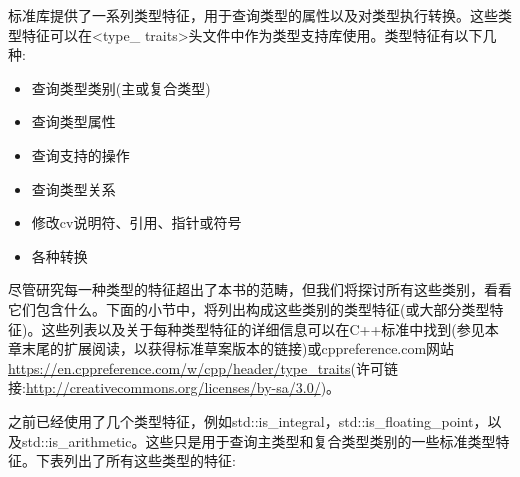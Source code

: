 
标准库提供了一系列类型特征，用于查询类型的属性以及对类型执行转换。这些类型特征可以在<type\_ traits>头文件中作为类型支持库使用。类型特征有以下几种:

\begin{itemize}
\item
查询类型类别(主或复合类型)

\item
查询类型属性

\item
查询支持的操作

\item
查询类型关系

\item
修改cv说明符、引用、指针或符号

\item
各种转换
\end{itemize}

尽管研究每一种类型的特征超出了本书的范畴，但我们将探讨所有这些类别，看看它们包含什么。下面的小节中，将列出构成这些类别的类型特征(或大部分类型特征)。这些列表以及关于每种类型特征的详细信息可以在C++标准中找到(参见本章末尾的扩展阅读，以获得标准草案版本的链接)或cppreference.com网站\url{https://en.cppreference.com/w/cpp/header/type_traits}(许可链接:\url{http://creativecommons.org/licenses/by-sa/3.0/})。


之前已经使用了几个类型特征，例如std::is\_integral，std::is\_floating\_point，以及std::is\_arithmetic。这些只是用于查询主类型和复合类型类别的一些标准类型特征。下表列出了所有这些类型的特征:


